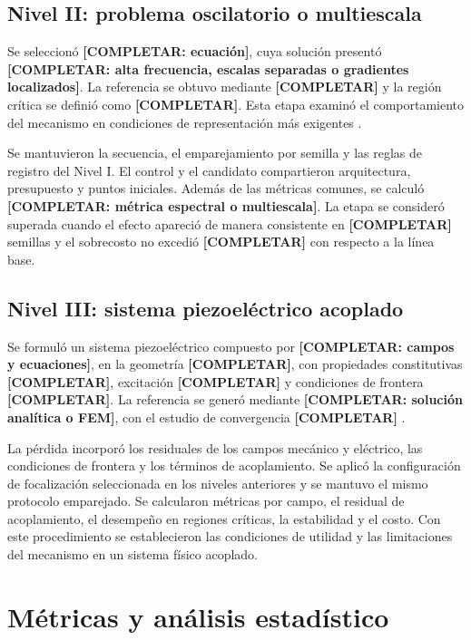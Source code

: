 \subsection{Nivel II: problema oscilatorio o multiescala}

Se seleccionó \textbf{[COMPLETAR: ecuación]}, cuya solución presentó \textbf{[COMPLETAR: alta frecuencia, escalas separadas o gradientes localizados]}. La referencia se obtuvo mediante \textbf{[COMPLETAR]} y la región crítica se definió como \textbf{[COMPLETAR]}. Esta etapa examinó el comportamiento del mecanismo en condiciones de representación más exigentes \cite{rahaman2019,tancik2020,wang2021eigenvector}.

Se mantuvieron la secuencia, el emparejamiento por semilla y las reglas de registro del Nivel I. El control y el candidato compartieron arquitectura, presupuesto y puntos iniciales. Además de las métricas comunes, se calculó \textbf{[COMPLETAR: métrica espectral o multiescala]}. La etapa se consideró superada cuando el efecto apareció de manera consistente en \textbf{[COMPLETAR]} semillas y el sobrecosto no excedió \textbf{[COMPLETAR]} con respecto a la línea base.

\subsection{Nivel III: sistema piezoeléctrico acoplado}

Se formuló un sistema piezoeléctrico compuesto por \textbf{[COMPLETAR: campos y ecuaciones]}, en la geometría \textbf{[COMPLETAR]}, con propiedades constitutivas \textbf{[COMPLETAR]}, excitación \textbf{[COMPLETAR]} y condiciones de frontera \textbf{[COMPLETAR]}. La referencia se generó mediante \textbf{[COMPLETAR: solución analítica o FEM]}, con el estudio de convergencia \textbf{[COMPLETAR]} \cite{tandis2025piezoelectric,mouratidou2026shunted}.

La pérdida incorporó los residuales de los campos mecánico y eléctrico, las condiciones de frontera y los términos de acoplamiento. Se aplicó la configuración de focalización seleccionada en los niveles anteriores y se mantuvo el mismo protocolo emparejado. Se calcularon métricas por campo, el residual de acoplamiento, el desempeño en regiones críticas, la estabilidad y el costo. Con este procedimiento se establecieron las condiciones de utilidad y las limitaciones del mecanismo en un sistema físico acoplado.

\section{Métricas y análisis estadístico}
\label{subsec:metricas}

